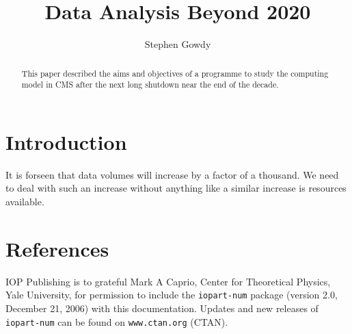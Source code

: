 \documentclass[a4paper]{jpconf}
\begin{document}
\title{Data Analysis Beyond 2020}

\author{Stephen Gowdy}

\address{4c Mains Drive, Erskine, PA8 7JQ, UK}


\begin{abstract}
This paper described the aims and objectives of a programme to study
the computing model in CMS after the next long shutdown near the end
of the decade.
\end{abstract}

\section{Introduction}
It is forseen that data volumes will increase by a factor of a
thousand. We need to deal with such an increase without anything like
a similar increase is resources available.

 

\section*{References}
\begin{thebibliography}{9}
 IOP Publishing is to grateful Mark A Caprio, Center for Theoretical Physics, Yale University, for permission to include the {\tt iopart-num} \BibTeX package (version 2.0, December 21, 2006) with  this documentation. Updates and new releases of {\tt iopart-num} can be found on \verb"www.ctan.org" (CTAN). 
\end{thebibliography}
\end{document}
